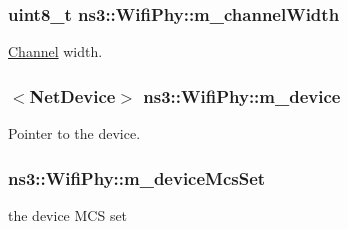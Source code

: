 \subsubsection[{\texorpdfstring{m\+\_\+channel\+Width}{m_channelWidth}}]{\setlength{\rightskip}{0pt plus 5cm}uint8\+\_\+t ns3\+::\+Wifi\+Phy\+::m\+\_\+channel\+Width\hspace{0.3cm}{\ttfamily [private]}}\hypertarget{classns3_1_1WifiPhy_a16c266805e99eda99af83a8291f1e2c5}{}\label{classns3_1_1WifiPhy_a16c266805e99eda99af83a8291f1e2c5}


\hyperlink{classns3_1_1Channel}{Channel} width. 

\subsubsection[{\texorpdfstring{m\+\_\+device}{m_device}}]{$<${\bf Net\+Device}$>$ ns3\+::\+Wifi\+Phy\+::m\+\_\+device\hspace{0.3cm}{\ttfamily [private]}}\hypertarget{classns3_1_1WifiPhy_a4af13f5ca1cceee58ec53b2172f39a43}{}\label{classns3_1_1WifiPhy_a4af13f5ca1cceee58ec53b2172f39a43}


Pointer to the device. 

\subsubsection[{\texorpdfstring{m\+\_\+device\+Mcs\+Set}{m_deviceMcsSet}}]{ ns3\+::\+Wifi\+Phy\+::m\+\_\+device\+Mcs\+Set\hspace{0.3cm}{\ttfamily [private]}}\hypertarget{classns3_1_1WifiPhy_a311c47eab48c799e5cc0d6d0fa0b0bb0}{}\label{classns3_1_1WifiPhy_a311c47eab48c799e5cc0d6d0fa0b0bb0}


the device M\+CS set 

